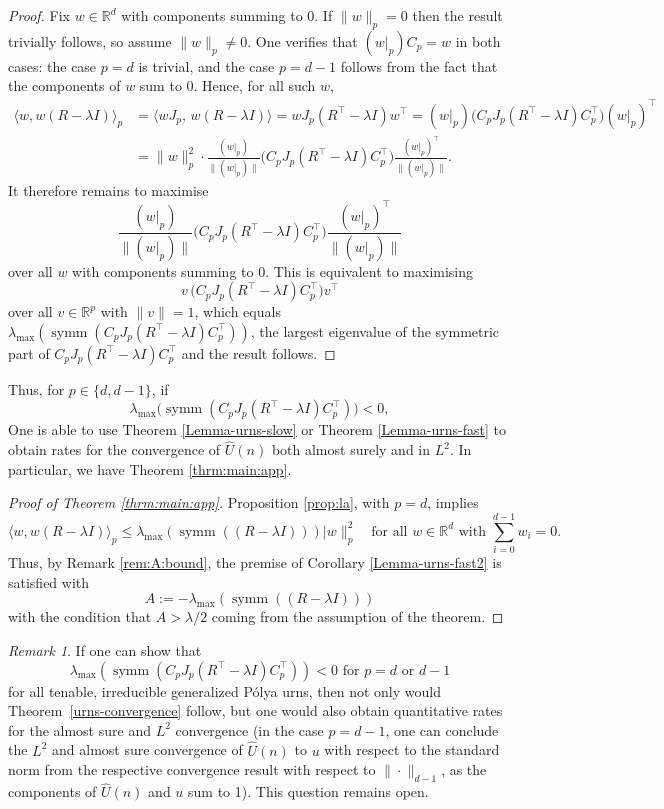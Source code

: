 \documentclass[12pt]{amsart}
\theoremstyle{definition}
\theoremstyle{remark}
\newtheorem{remark}[theorem]{Remark}
\begin{document}
\begin{proof}
     Fix 
$w \in \mathbb{R}^d$ with components summing to $0$. If $\|w\|_p = 0$ 
then the result trivially follows, so assume $\|w\|_p \neq 0$. One verifies that $(w|_p)C_p = w$ in 
both cases: the case $p = d$ is trivial, and the case $p = d-1$ follows from 
the fact that the components of $w$ sum to $0$. Hence, for all such $w$,
\begin{align*}
    \langle w, w(R - \lambda I)\rangle_p 
    &= \langle wJ_p,\, w(R - \lambda I)\rangle 
    = wJ_p(R^\top - \lambda I)w^\top 
    = (w|_p)\bigl(C_p J_p(R^\top - \lambda I)C_p^\top\bigr)(w|_p)^\top \\
    &= \|w\|_p^2 \cdot 
    \frac{(w|_p)}{\|(w|_p)\|}
    \bigl(C_p J_p(R^\top - \lambda I)C_p^\top\bigr)
    \frac{(w|_p)^\top}{\|(w|_p)\|}.
\end{align*}
It therefore remains to maximise
\[
\frac{(w|_p)}{\|(w|_p)\|}
\bigl(C_p J_p(R^\top - \lambda I)C_p^\top\bigr)
\frac{(w|_p)^\top}{\|(w|_p)\|}
\]
over all $w$ with components summing to $0$. This is equivalent to maximising
\[
v\,\bigl(C_p J_p(R^\top - \lambda I)C_p^\top\bigr)v^\top
\]
over all $v \in \mathbb{R}^p$ with $\|v\| = 1$, which equals 
$\lambda_{\max}(\operatorname{symm}(C_p J_p(R^\top - \lambda I)C_p^\top))$, 
the largest eigenvalue of the symmetric part of 
$C_p J_p(R^\top - \lambda I)C_p^\top$ and the result follows.
\end{proof}
Thus, for $p \in \{d,d-1\}$, if 
\[
\lambda_{\max}\bigl(\operatorname{symm}(C_p J_p(R^\top - \lambda I)
C_p^\top)\bigr)<0,
\]
One is able to use Theorem \ref{Lemma-urns-slow} or Theorem \ref{Lemma-urns-fast} to obtain rates for the convergence of  $\hat{U}(n)$ both almost surely and in $L^2$. In particular, we have Theorem \ref{thrm:main:app}.
\begin{proof}[Proof of Theorem \ref{thrm:main:app}]
Proposition \ref{prop:la}, with $p=d$, implies
 \[
\langle w, w(R - \lambda I)\rangle_p \leq \lambda_{\max}(\operatorname{symm}(
(R - \lambda I)))|w\|_p^2 
\quad \text{for all } w \in \mathbb{R}^{d} \text{ with } 
\sum_{i=0}^{d-1} w_i = 0.
\]
Thus, by Remark \ref{rem:A:bound}, the premise of Corollary \ref{Lemma-urns-fast2} is satisfied with 
\[
A:= -\lambda_{\max}(\operatorname{symm}(
(R - \lambda I)))
\]
with the condition that $A> \lambda/2$ coming from the assumption of the theorem.
    
\end{proof}

\begin{remark}
If one can show that
\[
\lambda_{\max}(\operatorname{symm}(C_p J_p (R^\top - \lambda I) C_p^\top)) < 0 
 \text{ for } p = d \mbox{ or } d-1
\]
for all tenable, irreducible generalized P\'olya urns, then not only would 
Theorem~\ref{urns-convergence} follow, but one would also obtain quantitative 
rates for the almost sure and $L^2$ convergence (in the case $p=d-1$, one can conclude 
the $L^2$ and almost sure convergence of $\hat{U}(n)$ to $u$ with respect to 
the standard norm from the respective convergence result with respect to $\|\cdot\|_{d-1}$, as the components of $\hat{U}(n)$ and $u$ sum to 1). This question remains open.
\end{remark}
\end{document}

